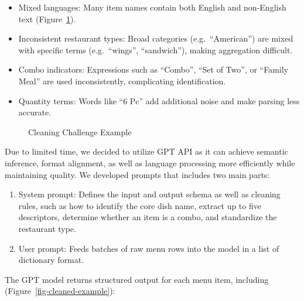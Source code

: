 \documentclass[
  11pt,
  a4paper,
  DIV=11,
  numbers=noendperiod]{scrartcl}
\providecommand{\tightlist}{%
  \setlength{\itemsep}{0pt}\setlength{\parskip}{0pt}}\usepackage{longtable,booktabs,array}
\begin{document}
\begin{itemize}
\tightlist
\item
  Mixed languages: Many item names contain both English and non-English
  text (Figure~\ref{fig-cleaning-challenge}).
\item
  Inconsistent restaurant types: Broad categories (e.g.~``American'')
  are mixed with specific terms (e.g.~``wings'', ``sandwich''), making
  aggregation difficult.
\item
  Combo indicators: Expressions such as ``Combo'', ``Set of Two'', or
  ``Family Meal'' are used inconsistently, complicating identification.
\item
  Quantity terms: Words like ``6 Pc'' add additional noise and make
  parsing less accurate.
\end{itemize}

\begin{figure}

\caption{\label{fig-cleaning-challenge}Cleaning Challenge Example}


\end{figure}%

Due to limited time, we decided to utilize GPT API as it can achieve
semantic inference, format alignment, as well as language processing
more efficiently while maintaining quality. We developed prompts that
includes two main parts:

\begin{enumerate}
\def\labelenumi{\arabic{enumi}.}
\tightlist
\item
  System prompt: Defines the input and output schema as well as cleaning
  rules, such as how to identify the core dish name, extract up to five
  descriptors, determine whether an item is a combo, and standardize the
  restaurant type.
\item
  User prompt: Feeds batches of raw menu rows into the model in a list
  of dictionary format.
\end{enumerate}

The GPT model returns structured output for each menu item, including
(Figure~\ref{fig-cleaned-example}):
\end{document}
